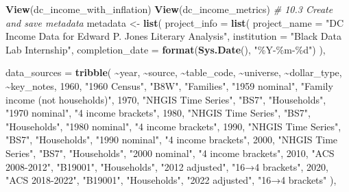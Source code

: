 \documentclass[
]{article}
\newenvironment{Shaded}{\begin{snugshade}}{\end{snugshade}}
\newcommand{\AttributeTok}[1]{\textcolor[rgb]{0.13,0.29,0.53}{#1}}
\newcommand{\CommentTok}[1]{\textcolor[rgb]{0.56,0.35,0.01}{\textit{#1}}}
\newcommand{\DecValTok}[1]{\textcolor[rgb]{0.00,0.00,0.81}{#1}}
\newcommand{\FunctionTok}[1]{\textcolor[rgb]{0.13,0.29,0.53}{\textbf{#1}}}
\newcommand{\NormalTok}[1]{#1}
\newcommand{\OtherTok}[1]{\textcolor[rgb]{0.56,0.35,0.01}{#1}}
\newcommand{\SpecialCharTok}[1]{\textcolor[rgb]{0.81,0.36,0.00}{\textbf{#1}}}
\newcommand{\StringTok}[1]{\textcolor[rgb]{0.31,0.60,0.02}{#1}}
\begin{document}
\begin{Shaded}
\begin{Highlighting}[]
\FunctionTok{View}\NormalTok{(dc\_income\_with\_inflation)}
\FunctionTok{View}\NormalTok{(dc\_income\_metrics)}
\CommentTok{\# 10.3 Create and save metadata}
\NormalTok{metadata }\OtherTok{\textless{}{-}} \FunctionTok{list}\NormalTok{(}
  \AttributeTok{project\_info =} \FunctionTok{list}\NormalTok{(}
    \AttributeTok{project\_name =} \StringTok{"DC Income Data for Edward P. Jones Literary Analysis"}\NormalTok{,}
    \AttributeTok{institution =} \StringTok{"Black Data Lab Internship"}\NormalTok{,}
    \AttributeTok{completion\_date =} \FunctionTok{format}\NormalTok{(}\FunctionTok{Sys.Date}\NormalTok{(), }\StringTok{"\%Y{-}\%m{-}\%d"}\NormalTok{)}
\NormalTok{  ),}
  
  \AttributeTok{data\_sources =} \FunctionTok{tribble}\NormalTok{(}
    \SpecialCharTok{\textasciitilde{}}\NormalTok{year, }\SpecialCharTok{\textasciitilde{}}\NormalTok{source, }\SpecialCharTok{\textasciitilde{}}\NormalTok{table\_code, }\SpecialCharTok{\textasciitilde{}}\NormalTok{universe, }\SpecialCharTok{\textasciitilde{}}\NormalTok{dollar\_type, }\SpecialCharTok{\textasciitilde{}}\NormalTok{key\_notes,}
    \DecValTok{1960}\NormalTok{, }\StringTok{"1960 Census"}\NormalTok{, }\StringTok{"B8W"}\NormalTok{, }\StringTok{"Families"}\NormalTok{, }\StringTok{"1959 nominal"}\NormalTok{, }\StringTok{"Family income (not households)"}\NormalTok{,}
    \DecValTok{1970}\NormalTok{, }\StringTok{"NHGIS Time Series"}\NormalTok{, }\StringTok{"BS7"}\NormalTok{, }\StringTok{"Households"}\NormalTok{, }\StringTok{"1970 nominal"}\NormalTok{, }\StringTok{"4 income brackets"}\NormalTok{,}
    \DecValTok{1980}\NormalTok{, }\StringTok{"NHGIS Time Series"}\NormalTok{, }\StringTok{"BS7"}\NormalTok{, }\StringTok{"Households"}\NormalTok{, }\StringTok{"1980 nominal"}\NormalTok{, }\StringTok{"4 income brackets"}\NormalTok{,}
    \DecValTok{1990}\NormalTok{, }\StringTok{"NHGIS Time Series"}\NormalTok{, }\StringTok{"BS7"}\NormalTok{, }\StringTok{"Households"}\NormalTok{, }\StringTok{"1990 nominal"}\NormalTok{, }\StringTok{"4 income brackets"}\NormalTok{,}
    \DecValTok{2000}\NormalTok{, }\StringTok{"NHGIS Time Series"}\NormalTok{, }\StringTok{"BS7"}\NormalTok{, }\StringTok{"Households"}\NormalTok{, }\StringTok{"2000 nominal"}\NormalTok{, }\StringTok{"4 income brackets"}\NormalTok{,}
    \DecValTok{2010}\NormalTok{, }\StringTok{"ACS 2008{-}2012"}\NormalTok{, }\StringTok{"B19001"}\NormalTok{, }\StringTok{"Households"}\NormalTok{, }\StringTok{"2012 adjusted"}\NormalTok{, }\StringTok{"16→4 brackets"}\NormalTok{,}
    \DecValTok{2020}\NormalTok{, }\StringTok{"ACS 2018{-}2022"}\NormalTok{, }\StringTok{"B19001"}\NormalTok{, }\StringTok{"Households"}\NormalTok{, }\StringTok{"2022 adjusted"}\NormalTok{, }\StringTok{"16→4 brackets"}
\NormalTok{  ),}
  

\end{Highlighting}
\end{Shaded}
\end{document}
